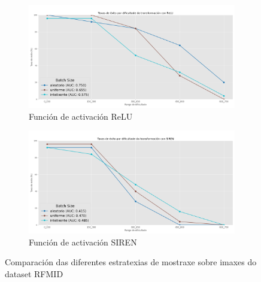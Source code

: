 \begin{figure}[ht]
    \centering
    \begin{subfigure}[b]{0.48\textwidth}
        \centering
        \includegraphics[width=\textwidth]{imaxes/muestraje/experiment_plot_RFMID_st_relu.png}
        \caption{Función de activación ReLU}
        \label{fig:sampling_types_relu}
    \end{subfigure}\hfill
    \begin{subfigure}[b]{0.48\textwidth}
        \centering
        \includegraphics[width=\textwidth]{imaxes/muestraje/experiment_plot_RFMID_st_SIREN.png}
        \caption{Función de activación SIREN}
        \label{fig:sampling_types_siren}
    \end{subfigure}
    \caption{Comparación das diferentes estratexias de mostraxe sobre imaxes do dataset RFMID}
    \label{fig:sampling_types_comparisons}
\end{figure}





